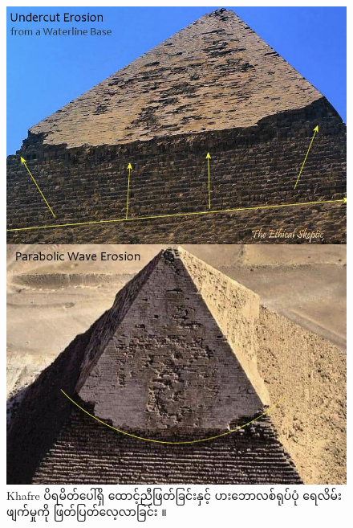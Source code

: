 \documentclass[10pt,twocolumn,letterpaper]{article}
\begin{document}
\begin{figure}[H]
\begin{center}
   \includegraphics[width=1\linewidth]{wave.jpg}
\end{center}
   \caption{Khafre ပိရမိတ်ပေါ်ရှိ ထောင့်ညီဖြတ်ခြင်းနှင့် ပားဘောလစ်ရုပ်ပုံ ရေလိမ်းဖျက်မှုကို ဖြတ်ပြတ်လေ့လာခြင်း \cite{27}။}
\label{fig:19}
\label{fig:onecol}
\end{figure}
\end{document}
